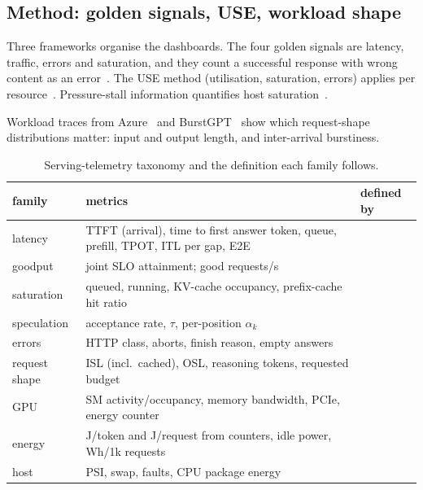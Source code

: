 \documentclass[11pt]{article}
\begin{document}
\subsection{Method: golden signals, USE, workload shape}

Three frameworks organise the dashboards. The four golden signals are latency, traffic, errors and
saturation, and they count a successful response with wrong content as an
error~\citep{sre_monitoring}. The USE method (utilisation, saturation, errors) applies per
resource~\citep{gregg_use}. Pressure-stall information quantifies host saturation~\citep{linux_psi}.

Workload traces from Azure~\citep{azure_trace} and BurstGPT~\citep{wang2024burstgpt} show which
request-shape distributions matter: input and output length, and inter-arrival burstiness.

\begin{table}[t]
\centering\small
\caption{Serving-telemetry taxonomy and the definition each family follows.}
\label{tab:taxonomy}
\begin{tabularx}{\linewidth}{@{}lYl@{}}
\toprule
family & metrics & defined by \\
\midrule
latency & TTFT (arrival), time to first answer token, queue, prefill, TPOT, ITL per gap, E2E &
\citep{otel_genai_metrics,vllm_metrics,nvidia_aiperf,mlperf_rules} \\
goodput & joint SLO attainment; good requests/s & \citep{zhong2024distserve,nvidia_aiperf} \\
saturation & queued, running, KV-cache occupancy, prefix-cache hit ratio & \citep{gie_msp,vllm_metrics,sglang_metrics} \\
speculation & acceptance rate, $\tau$, per-position $\alpha_k$ & \citep{leviathan2023spec,li2024eagle,vllm_metrics} \\
errors & HTTP class, aborts, finish reason, empty answers & \citep{sre_monitoring,otel_genai_spans,openai_reasoning} \\
request shape & ISL (incl.\ cached), OSL, reasoning tokens, requested budget & \citep{nvidia_aiperf,azure_trace,wang2024burstgpt} \\
GPU & SM activity/occupancy, memory bandwidth, PCIe, energy counter & \citep{dcgm_features,nvml_api} \\
energy & J/token and J/request from counters, idle power, Wh/1k requests & \citep{chung2025mlenergy,aienergyscore,elsworth2025google} \\
host & PSI, swap, faults, CPU package energy & \citep{gregg_use,linux_psi} \\
\bottomrule
\end{tabularx}
\end{table}
\end{document}
